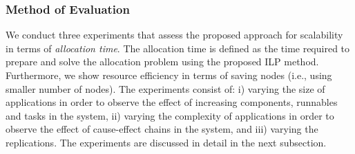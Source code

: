 \subsubsection{Method of Evaluation}
We conduct three experiments that assess the proposed approach for scalability in terms of \textit{allocation time}. The allocation time is defined as the time required to prepare and solve the allocation problem using the proposed ILP method. Furthermore, we show resource efficiency in terms of saving nodes (i.e., using smaller number of nodes). The experiments consist of: i) varying the size of applications in order to observe the effect of increasing components, runnables and tasks in the system, ii) varying the complexity of applications in order to observe the effect of cause-effect chains in the system, and iii) varying the replications. The experiments are discussed in detail in the next subsection.

